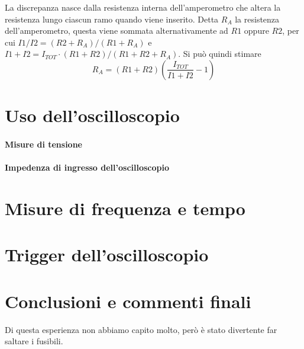 \documentclass[10pt,a4paper]{article}
\begin{document}
La discrepanza nasce dalla resistenza interna dell'amperometro che altera la 
resistenza lungo ciascun ramo quando viene inserito. Detta $R_A$ la resistenza dell'amperometro,
questa viene sommata alternativamente ad $R1$ oppure $R2$, per cui $I1/I2 = (R2+R_A)/(R1+R_A)$ 
e $I1+I2 = I_{TOT}\cdot(R1+R2)/(R1+R2+R_A)$.
Si pu\`o quindi stimare 
$$
R_A = (R1+R2)\left(\frac{I_{TOT}}{I1+I2} - 1 \right)
$$


\section{Uso dell'oscilloscopio}

\paragraph{Misure di tensione}

\paragraph{Impedenza di ingresso dell'oscilloscopio}

\section{Misure di frequenza e tempo}

\section{Trigger dell'oscilloscopio}

\section{Conclusioni e commenti finali}
Di questa esperienza non abbiamo capito molto, per\`o \`e stato divertente far saltare i fusibili. 
\end{document}
